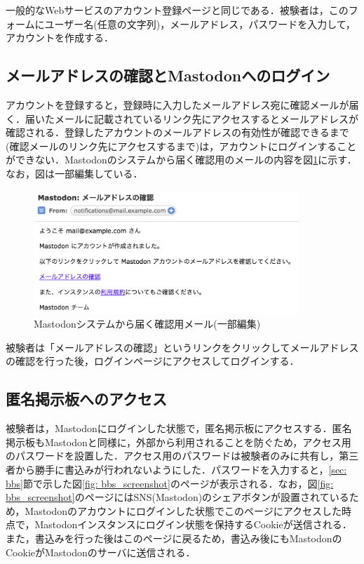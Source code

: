 \documentclass[10pt, a4paper]{jreport}
\begin{document}
一般的なWebサービスのアカウント登録ページと同じである．被験者は，このフォームにユーザー名(任意の文字列)，メールアドレス，パスワードを入力して，アカウントを作成する．

\subsection{メールアドレスの確認とMastodonへのログイン}
アカウントを登録すると，登録時に入力したメールアドレス宛に確認メールが届く．届いたメールに記載されているリンク先にアクセスするとメールアドレスが確認される．登録したアカウントのメールアドレスの有効性が確認できるまで(確認メールのリンク先にアクセスするまで)は，アカウントにログインすることができない．Mastodonのシステムから届く確認用のメールの内容を図\ref{fig: mastodon_mail}に示す．なお，図は一部編集している．

\begin{figure}[H]
	\begin{center}
		\includegraphics[width=100mm]{figures/mastodon_mail.png}
	\end{center}
	\caption{Mastodonシステムから届く確認用メール(一部編集)}
	\label{fig: mastodon_mail}
\end{figure}

被験者は「メールアドレスの確認」というリンクをクリックしてメールアドレスの確認を行った後，ログインページにアクセスしてログインする．

\subsection{匿名掲示板へのアクセス}
被験者は，Mastodonにログインした状態で，匿名掲示板にアクセスする．匿名掲示板もMastodonと同様に，外部から利用されることを防ぐため，アクセス用のパスワードを設置した．アクセス用のパスワードは被験者のみに共有し，第三者から勝手に書込みが行われないようにした．パスワードを入力すると，\ref{sec: bbs}節で示した図\ref{fig: bbs_screenshot}のページが表示される．なお，図\ref{fig: bbs_screenshot}のページにはSNS(Mastodon)のシェアボタンが設置されているため，Mastodonのアカウントにログインした状態でこのページにアクセスした時点で，Mastodonインスタンスにログイン状態を保持するCookieが送信される．また，書込みを行った後はこのページに戻るため，書込み後にもMastodonのCookieがMastodonのサーバに送信される．
\end{document}
